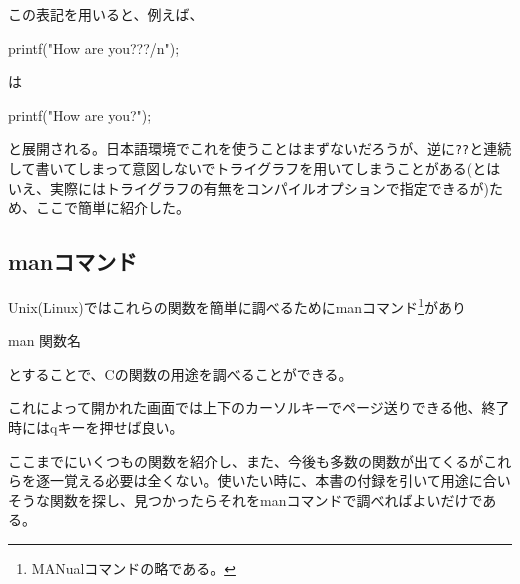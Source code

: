 この表記を用いると、例えば、
\begin{code}
printf("How are you???/n");
\end{code}
は
\begin{code}
printf("How are you?\n");
\end{code}
と展開される。日本語環境でこれを使うことはまずないだろうが、逆に\verb|??|と連続して書いてしまって意図しないでトライグラフを用いてしまうことがある(とはいえ、実際にはトライグラフの有無をコンパイルオプションで指定できるが)ため、ここで簡単に紹介した。

\subsection{manコマンド}
Unix(Linux)ではこれらの関数を簡単に調べるためにmanコマンド\footnote{MANualコマンドの略である。}があり
\begin{code}
man 関数名
\end{code}
とすることで、Cの関数の用途を調べることができる。

これによって開かれた画面では上下のカーソルキーでページ送りできる他、終了時にはqキーを押せば良い。

ここまでにいくつもの関数を紹介し、また、今後も多数の関数が出てくるがこれらを逐一覚える必要は全くない。使いたい時に、本書の付録を引いて用途に合いそうな関数を探し、見つかったらそれをmanコマンドで調べればよいだけである。

